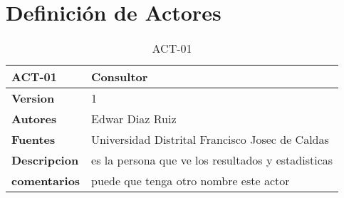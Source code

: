 \section{Definición de Actores}

\begin{table}[H]
	\centering
	\caption{ACT-01}
	\label{ACT-01}
	\begin{tabular}{|l|l|}
		\hline
		\textbf{ACT-01}      & \textbf{Consultor}                                 \\ \hline
		\textbf{Version}     & 1                                                  \\ \hline
		\textbf{Autores}     & Edwar Diaz Ruiz                                    \\ \hline
		\textbf{Fuentes}     & Universidad Distrital Francisco Josec de Caldas    \\ \hline
		\textbf{Descripcion} & es la persona que ve los resultados y estadisticas \\ \hline
		\textbf{comentarios} & puede que tenga otro nombre este actor             \\ \hline
	\end{tabular}
\end{table}